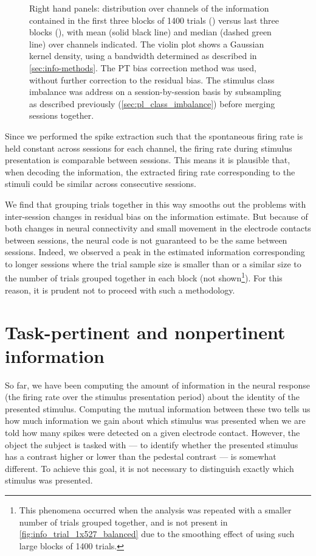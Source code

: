 \begin{figure}[htbp]
{Right hand panels: distribution over channels of the information contained in the first three blocks of \num{1400} trials () versus last three blocks (), with mean (solid black line) and median (dashed green line) over channels indicated.
The violin plot shows a Gaussian kernel density, using a bandwidth determined as described in \autoref{sec:info-methods}.
The \ac{PT} bias correction method was used, without further correction to the residual bias.
The stimulus class imbalance was address on a session-by-session basis by subsampling as described previously (\autoref{sec:pl_class_imbalance}) before merging sessions together.
}
    \label{fig:info_trial_1x527_balanced}
\end{figure}


Since we performed the spike extraction such that the spontaneous firing rate is held constant across sessions for each channel, the firing rate during stimulus presentation is comparable between sessions.
This means it is plausible that, when decoding the information, the extracted firing rate corresponding to the stimuli could be similar across consecutive sessions.

We find that grouping trials together in this way smooths out the problems with inter-session changes in residual bias on the information estimate.
But because of both changes in neural connectivity and small movement in the electrode contacts between sessions, the neural code is not guaranteed to be the same between sessions.
Indeed, we observed a peak in the estimated information corresponding to longer sessions where the trial sample size is smaller than or a similar size to the number of trials grouped together in each block (not shown\footnote{This phenomena occurred when the analysis was repeated with a smaller number of trials grouped together, and is not present in \autoref{fig:info_trial_1x527_balanced} due to the smoothing effect of using such large blocks of \num{1400} trials.}).
For this reason, it is prudent not to proceed with such a methodology.


\section{Task-pertinent and nonpertinent information}
\label{sec:task-info}

So far, we have been computing the amount of information in the neural response (the firing rate over the stimulus presentation period) about the identity of the presented stimulus.
Computing the mutual information between these two tells us how much information we gain about which stimulus was presented when we are told how many spikes were detected on a given electrode contact.
However, the object the subject is tasked with --- to identify whether the presented stimulus has a contrast higher or lower than the pedestal contrast --- is somewhat different.
To achieve this goal, it is not necessary to distinguish exactly which stimulus was presented.

